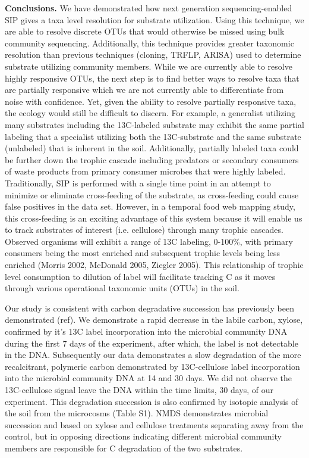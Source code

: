 \textbf{Conclusions.} We have demonstrated how next generation sequencing-enabled SIP gives a taxa level resolution for substrate utilization. Using this technique, we are able to resolve discrete OTUs that would otherwise be missed using bulk community sequencing. Additionally, this technique provides greater taxonomic resolution than previous techniques (cloning, TRFLP, ARISA) used to determine substrate utilizing community members. While we are currently able to resolve highly responsive OTUs, the next step is to find better ways to resolve taxa that are partially responsive which we are not currently able to differentiate from noise with confidence. Yet, given the ability to resolve partially responsive taxa, the ecology would still be difficult to discern. For example, a generalist utilizing many substrates including the 13C-labeled substrate may exhibit the same partial labeling that a specialist utilizing both the 13C-substrate and the same substrate (unlabeled) that is inherent in the soil. Additionally, partially labeled taxa could be further down the trophic cascade including predators or secondary consumers of waste products from primary consumer microbes that were highly labeled.     
Traditionally, SIP is performed with a single time point in an attempt to minimize or eliminate cross-feeding of the substrate, as cross-feeding could cause false positives in the data set.  However, in a temporal food web mapping study, this cross-feeding is an exciting advantage of this system because it will enable us to track substrates of interest (i.e. cellulose) through many trophic cascades.  Observed organisms will exhibit a range of 13C labeling, 0-100\%, with primary consumers being the most enriched and subsequent trophic levels being less enriched (Morris 2002, McDonald 2005, Ziegler 2005).  This relationship of trophic level consumption to dilution of label will facilitate tracking C as it moves through various operational taxonomic units (OTUs) in the soil. 

Our study is consistent with carbon degradative succession has previously been demonstrated (ref). We demonstrate a rapid decrease in the labile carbon, xylose, confirmed by it’s 13C label incorporation into the microbial community DNA during the first 7 days of the experiment, after which, the label is not detectable in the DNA. Subsequently our data demonstrates a slow degradation of the more recalcitrant, polymeric carbon demonstrated by 13C-cellulose label incorporation into the microbial community DNA at 14 and 30 days.  We did not observe the 13C-cellulose signal leave the DNA within the time limits, 30 days, of our experiment.  This degradation succession is also confirmed by isotopic analysis of the soil from the microcosms (Table S1). NMDS demonstrates microbial succession and based on xylose and cellulose treatments separating away from the control, but in opposing directions indicating different microbial community members are responsible for C degradation of the two substrates. 

